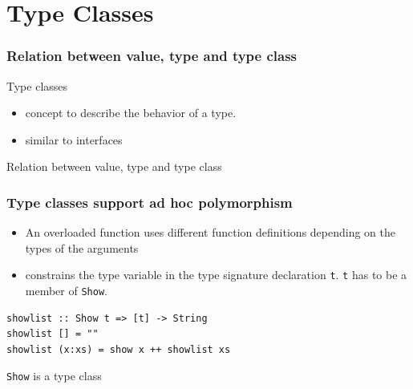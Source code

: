 \documentclass{beamer}
\begin{document}
\section{Type Classes}

\begin{frame}
  \frametitle{Relation between value, type and type class}
  \begin{block}{Type classes}
    \begin{itemize}
    \item concept to describe the behavior of a type.
    \item similar to interfaces
    \end{itemize}

  \end{block}

  \begin{block}{Relation between value, type and type class}

  \end{block}


\end{frame}

\lstset{
basicstyle=\ttfamily,
columns=fullflexible,
keepspaces=true,
captionpos=b
}


\begin{frame}[fragile]
  \frametitle{Type classes support ad hoc polymorphism}
  \begin{itemize}
  \item An overloaded function uses different function definitions depending on the types of the arguments
  \item constrains the type variable in the type signature declaration \verb|t|. \verb|t| has to be a member of \verb|Show|.
  \end{itemize}
\begin{lstlisting}
showlist :: Show t => [t] -> String
showlist [] = ""
showlist (x:xs) = show x ++ showlist xs
\end{lstlisting}
\verb|Show| is a type class
\end{frame}
\end{document}
